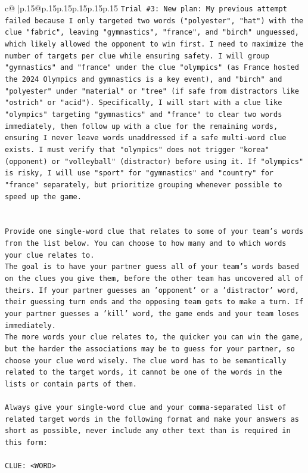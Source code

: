 \documentclass{article}
\begin{document}
{\begin{supertabular}{c@{$\;$}|p{.15\linewidth}@{}p{.15\linewidth}p{.15\linewidth}p{.15\linewidth}p{.15\linewidth}p{.15\linewidth}}
{{{\texttt{Trial \#3: New plan: My previous attempt failed because I only targeted two words ("polyester", "hat") with the clue "fabric", leaving "gymnastics", "france", and "birch" unguessed, which likely allowed the opponent to win first. I need to maximize the number of targets per clue while ensuring safety. I will group "gymnastics" and "france" under the clue "olympics" (as France hosted the 2024 Olympics and gymnastics is a key event), and "birch" and "polyester" under "material" or "tree" (if safe from distractors like "ostrich" or "acid"). Specifically, I will start with a clue like "olympics" targeting "gymnastics" and "france" to clear two words immediately, then follow up with a clue for the remaining words, ensuring I never leave words unaddressed if a safe multi{-}word clue exists. I must verify that "olympics" does not trigger "korea" (opponent) or "volleyball" (distractor) before using it. If "olympics" is risky, I will use "sport" for "gymnastics" and "country" for "france" separately, but prioritize grouping whenever possible to speed up the game.} \\
\\ 
\\ 
\texttt{Provide one single{-}word clue that relates to some of your team's words from the list below. You can choose to how many and to which words your clue relates to.} \\
\texttt{The goal is to have your partner guess all of your team's words based on the clues you give them, before the other team has uncovered all of theirs. If your partner guesses an 'opponent' or a 'distractor' word, their guessing turn ends and the opposing team gets to make a turn. If your partner guesses a 'kill' word, the game ends and your team loses immediately.} \\
\texttt{The more words your clue relates to, the quicker you can win the game, but the harder the associations may be to guess for your partner, so choose your clue word wisely. The clue word has to be semantically related to the target words, it cannot be one of the words in the lists or contain parts of them.} \\
\\ 
\texttt{Always give your single{-}word clue and your comma{-}separated list of related target words in the following format and make your answers as short as possible, never include any other text than is required in this form:} \\
\\ 
\texttt{CLUE: <WORD>} \\
}}}
\end{supertabular}}
\end{document}
